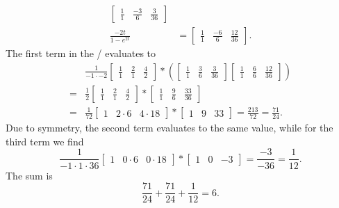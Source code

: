 \begin{example}
\begin{align*}
\begin{bmatrix}
\displaystyle\frac{1}{1} & \displaystyle\frac{-3}{6} & \displaystyle\frac{3}{36}
\end{bmatrix}
\\
\frac{-2t}{1-e^{2t}} & = 
\begin{bmatrix}
\displaystyle\frac{1}{1} & \displaystyle\frac{-6}{6} & \displaystyle\frac{12}{36}
\end{bmatrix}
.
\end{align*}
The first term in the \rgf/ evaluates to
\begin{align*}
&
\frac 1{-1 \cdot -2}
\begin{bmatrix}
\displaystyle\frac{1}{1} & \displaystyle\frac{2}{1} & \displaystyle\frac{4}{2}
\end{bmatrix}
*
\left(
\begin{bmatrix}
\displaystyle\frac{1}{1} & \displaystyle\frac{3}{6} & \displaystyle\frac{3}{36}
\end{bmatrix}
\begin{bmatrix}
\displaystyle\frac{1}{1} & \displaystyle\frac{6}{6} & \displaystyle\frac{12}{36}
\end{bmatrix}
\right)
\\
= {} &
\frac 1{2}
\begin{bmatrix}
\displaystyle\frac{1}{1} & \displaystyle\frac{2}{1} & \displaystyle\frac{4}{2}
\end{bmatrix}
*
\begin{bmatrix}
\displaystyle\frac{1}{1} & \displaystyle\frac{9}{6} & \displaystyle\frac{33}{36}
\end{bmatrix}
\\
= {} &
\frac 1{72}
\begin{bmatrix}
1 & 2 \cdot 6 & 4 \cdot 18
\end{bmatrix}
*
\begin{bmatrix}
1 & 9 & 33
\end{bmatrix}
= \frac {213}{72} = \frac{71}{24}
.
\end{align*}
Due to symmetry, the second term evaluates to the same value,
while for the third term we find
$$
\frac{1}{-1\cdot 1 \cdot 36}
\begin{bmatrix}
1 & 0 \cdot 6 & 0 \cdot 18
\end{bmatrix}
*
\begin{bmatrix}
1 & 0 & -3
\end{bmatrix}
=
\frac{-3}{-36} = \frac 1{12}
.
$$
The sum is
$$
\frac{71}{24} + \frac{71}{24} + \frac 1{12} = 6
.
$$
\end{example}


